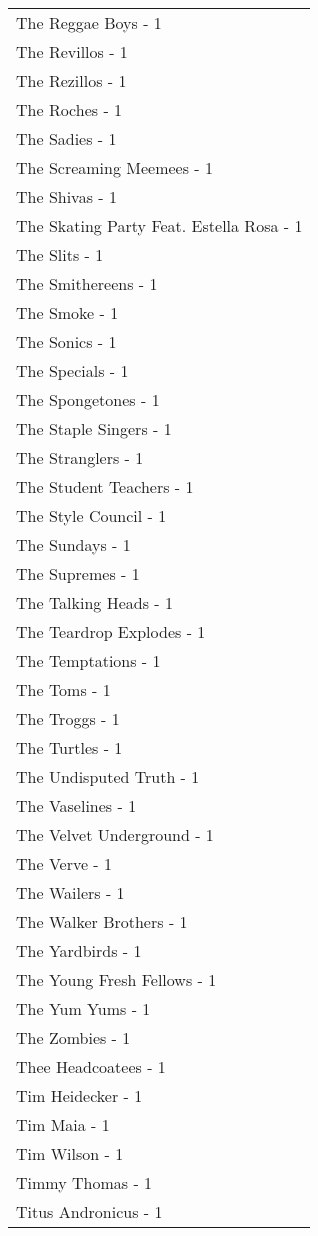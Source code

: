 \documentclass[
]{article}
\begin{document}
\begin{longtable}{l}
The Reggae Boys - 1 \\ 
The Revillos - 1 \\ 
The Rezillos - 1 \\ 
The Roches - 1 \\ 
The Sadies - 1 \\ 
The Screaming Meemees - 1 \\ 
The Shivas - 1 \\ 
The Skating Party Feat. Estella Rosa - 1 \\ 
The Slits - 1 \\ 
The Smithereens - 1 \\ 
The Smoke - 1 \\ 
The Sonics - 1 \\ 
The Specials - 1 \\ 
The Spongetones - 1 \\ 
The Staple Singers - 1 \\ 
The Stranglers - 1 \\ 
The Student Teachers - 1 \\ 
The Style Council - 1 \\ 
The Sundays - 1 \\ 
The Supremes - 1 \\ 
The Talking Heads - 1 \\ 
The Teardrop Explodes - 1 \\ 
The Temptations - 1 \\ 
The Toms - 1 \\ 
The Troggs - 1 \\ 
The Turtles - 1 \\ 
The Undisputed Truth - 1 \\ 
The Vaselines - 1 \\ 
The Velvet Underground - 1 \\ 
The Verve - 1 \\ 
The Wailers - 1 \\ 
The Walker Brothers - 1 \\ 
The Yardbirds - 1 \\ 
The Young Fresh Fellows - 1 \\ 
The Yum Yums - 1 \\ 
The Zombies - 1 \\ 
Thee Headcoatees - 1 \\ 
Tim Heidecker - 1 \\ 
Tim Maia - 1 \\ 
Tim Wilson - 1 \\ 
Timmy Thomas - 1 \\ 
Titus Andronicus - 1 \\ 

\end{longtable}
\end{document}
